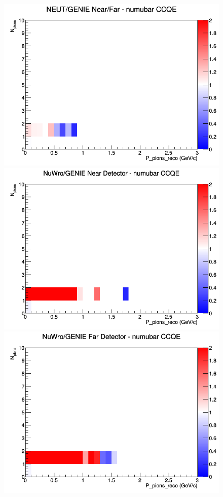 \documentclass[12pt]{article}
\begin{document}
\begin{figure}[h]
\endminipage
{}
\includegraphics[width=\linewidth]{eff_N_P/GAr/pions/ratios/CCQE_NEUT_GENIE_numubar_NF_N_P.png}
\endminipage
\newline
{}
\includegraphics[width=\linewidth]{eff_N_P/GAr/pions/ratios/CCQE_NuWro_GENIE_numubar_near_N_P.png}
\endminipage
{}
\includegraphics[width=\linewidth]{eff_N_P/GAr/pions/ratios/CCQE_NuWro_GENIE_numubar_far_N_P.png}

\end{figure}
\end{document}
